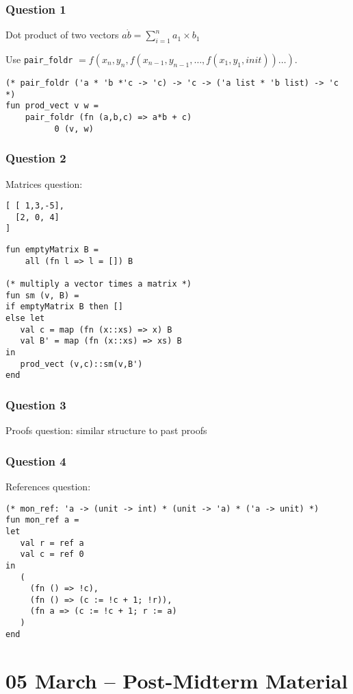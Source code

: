 \documentclass[11pt]{article}
\begin{document}
\subsubsection{Question 1}
Dot product of two vectors $a \dot b = \sum_{i=1}^n a_1 \times b_1$

Use \verb~pair_foldr~ $ = f(x_n,y_n,f(x_{n-1},y_{n-1}, \ldots, f(x_1, y_1, init)) \ldots )$.

\begin{verbatim}
(* pair_foldr ('a * 'b *'c -> 'c) -> 'c -> ('a list * 'b list) -> 'c *)
fun prod_vect v w =
    pair_foldr (fn (a,b,c) => a*b + c)
          0 (v, w)
\end{verbatim}

\subsubsection{Question 2}
Matrices question:

\begin{verbatim}
[ [ 1,3,-5],
  [2, 0, 4]
]
\end{verbatim}

\begin{verbatim}
fun emptyMatrix B =
    all (fn l => l = []) B

(* multiply a vector times a matrix *)
fun sm (v, B) = 
if emptyMatrix B then []
else let
   val c = map (fn (x::xs) => x) B
   val B' = map (fn (x::xs) => xs) B
in
   prod_vect (v,c)::sm(v,B')
end
\end{verbatim}

\subsubsection{Question 3}
Proofs question: similar structure to past proofs

\subsubsection{Question 4}
References question:

\begin{verbatim}
(* mon_ref: 'a -> (unit -> int) * (unit -> 'a) * ('a -> unit) *)
fun mon_ref a = 
let
   val r = ref a
   val c = ref 0
in
   (
     (fn () => !c),
     (fn () => (c := !c + 1; !r)),
     (fn a => (c := !c + 1; r := a)
   )
end
\end{verbatim}

\section{05 March -- Post-Midterm Material}
\end{document}
